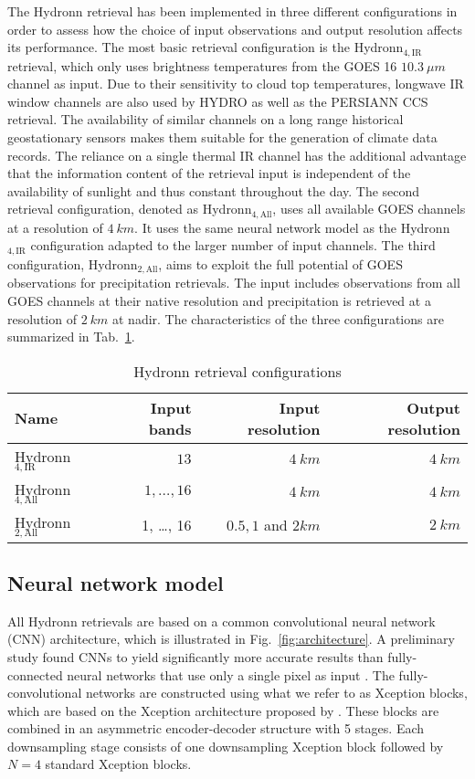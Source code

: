 \documentclass[journal abbreviation, manuscript]{copernicus}
\newcommand{\hydronntwo}{Hydronn$_{2, \text{All}}$}
\newcommand{\hydronnfourall}{Hydronn$_{4, \text{All}}$}
\newcommand{\hydronnfourir}{Hydronn$_{4, \text{IR}}$}
\begin{document}
The Hydronn retrieval has been implemented in three different configurations in
order to assess how the choice of input observations and output resolution
affects its performance. The most basic retrieval configuration is the
\hydronnfourir{} retrieval, which only uses brightness temperatures from the
GOES 16 $10.3\ \unit{\mu m}$ channel as input. Due to their sensitivity to cloud
top temperatures, longwave IR window channels are also used by HYDRO as well as
the PERSIANN CCS retrieval. The availability of similar channels on a long range
historical geostationary sensors makes them suitable for the generation of
climate data records. The reliance on a single thermal IR channel has the
additional advantage that the information content of the retrieval input is
independent of the availability of sunlight and thus constant throughout the
day. The second retrieval configuration, denoted as \hydronnfourall{}, uses all
available GOES channels at a resolution of $4\ \unit{km}$. It uses the same
neural network model as the \hydronnfourir{} configuration adapted to the larger
number of input channels. The third configuration, \hydronntwo{}, aims to
exploit the full potential of GOES observations for precipitation retrievals.
The input includes observations from all GOES channels at their native
resolution and precipitation is retrieved at a resolution of $2\ \unit{km}$ at
nadir. The characteristics of the three configurations are summarized in
Tab.~\ref{tab:configurations}.

\begin{table}[hbpt!]
  \centering
  \caption{Hydronn retrieval configurations}
  \label{tab:configurations}
  \begin{tabular}{l|rrr}
  Name & Input bands & Input resolution & Output resolution \\
  \hline
  \hydronnfourir{} & $13$ & $4\ \unit{km}$ & $4 \ \unit{km}$ \\
  \hydronnfourall{} & $1, \ldots, 16$ & $4\ \unit{km}$ & $4 \ \unit{km}$ \\
  \hydronntwo{} & 1, \ldots, 16 & $0.5, 1$ and $2 \unit{km}$ & $2 \ \unit{km}$
  \end{tabular}
\end{table}


\subsection{Neural network model}

All Hydronn retrievals are based on a common convolutional neural network (CNN)
architecture, which is illustrated in Fig.~\ref{fig:architecture}. A preliminary
study found CNNs to yield significantly more accurate results than
fully-connected neural networks that use only a single pixel as input
\citep{ingemarsson21}. The fully-convolutional networks are constructed using
what we refer to as Xception blocks, which are based on the Xception
architecture proposed by \citet{chollet17}. These blocks are combined in an
asymmetric encoder-decoder structure with 5 stages. Each downsampling stage
consists of one downsampling Xception block followed by $N=4$ standard Xception
blocks.
\end{document}
